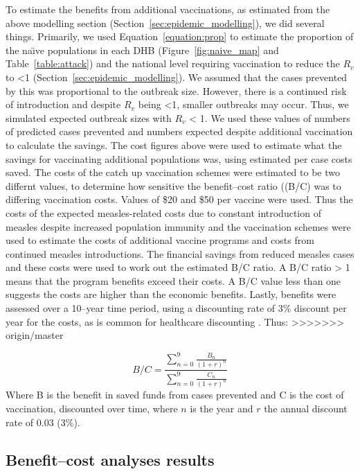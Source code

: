\documentclass{article}
\begin{document}
\begin{itemize}
To estimate the benefits from additional vaccinations, as estimated from the above modelling section (Section~\ref{sec:epidemic_modelling}), we did several things. Primarily, we used Equation~\ref{equation:prop} to estimate the proportion of the na\"{\i}ve populations in each DHB (Figure~\ref{fig:naive_map} and Table~\ref{table:attack}) and the national level requiring vaccination to reduce the $R_v$ to <1 (Section~\ref{sec:epidemic_modelling}). We assumed that the cases prevented by this was proportional to the outbreak size. However, there is a continued risk of introduction and despite $R_v$ being <1, smaller outbreaks may occur. Thus, we simulated expected outbreak sizes with $R_v$ < 1. We used these values of numbers of predicted cases prevented and numbers expected despite additional vaccination to calculate the savings. The cost figures above were used to estimate what the savings for vaccinating additional populations was, using estimated per case costs saved. The costs of the catch up vaccination schemes were estimated to be two differnt values, to determine how sensitive the benefit--cost ratio ((B/C) was to differing vaccination costs. Values of \$20 and \$50 per vaccine were used. Thus the costs of the expected measles-related costs due to constant introduction of measles despite increased population immunity and the vaccination schemes were used to estimate the costs of additional vaccine programs and costs from continued measles introductions. The financial savings from reduced measles cases and these costs were used to work out the estimated B/C ratio. A B/C ratio > 1 means that the program benefits exceed their costs. A B/C value less than one suggests the costs are higher than the economic benefits. Lastly, benefits were assessed over a 10--year time period, using a discounting rate of 3\% discount per year for the costs, as is common for healthcare discounting \citep{honeycutt6}. Thus:
>>>>>>> origin/master

\begin{equation} \label{eq:bc}
 \textit{B/C} = \frac{\sum\limits_{n=0}^{9} \frac{B_n}{(1+r)^n}}{\sum\limits_{n=0}^{9} \frac{C_n}{(1+r)^n}}
 \end{equation}
Where B is the benefit in saved funds from cases prevented and C is the cost of vaccination, discounted over time, where $n$ is the year and $r$ the annual discount rate of 0.03 (3\%).

\subsection{Benefit--cost analyses results}


\end{itemize}
\end{document}
